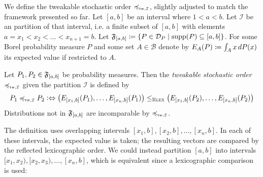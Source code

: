 \documentclass[a4paper]{scrreprt}
\newcommand{\B}{\mathcal{B}}
\begin{document}
    We define the tweakable stochastic order $\leqtw$, slightly adjusted to match the framework presented so far.
    Let $[a, b]$ be an interval where $1 < a < b$. Let $\mathcal{I}$ be an partition of that interval, i.e. a finite subset of $[a, b]$ with elements $a = x_1 < x_2 < \dots < x_{n+1} = b$.
    Let $\mathfrak{F}_{[a, b]} \coloneqq \{P \in \mathcal{D}_P \mid \operatorname{supp}(P) \subseteq [a, b]\}$.
    For some Borel probability measure $P$ and some set $A \in \B$ denote by $E_A(P) \coloneqq \int_{A} x \, dP(x)$ its expected value if restricted to $A$. 
    \begin{defn}
        \label{def:tweakableStochasticOrder}
        Let $P_1, P_2 \in \mathfrak{F}_{[a, b]}$ be probability measures.
        Then the \emph{tweakable stochastic order} $\leqtw$ given the partition $\mathcal{I}$ is defined by
        \begin{gather*}
            P_1 \leqtw P_2 \colonlra \bigpars{E_{[x_1, b]}(P_{1}), \dots, E_{[x_n, b]}(P_1)} \leqRlex \bigpars{E_{[x_1, b]}(P_2), \dots, E_{[x_n, b]}(P_2)}
        \end{gather*}
        Distributions not in $\mathfrak{F}_{[a, b]}$ are incomparable by $\leqtw$.
    \end{defn}

    The definition uses overlapping intervals $[x_1, b], [x_2, b], \dots, [x_n, b]$. In each of these intervals, the expected value is taken; the resulting vectors are compared by the reflected lexicographic order. We could instead partition $[a, b]$  into intervals $[x_1, x_2), [x_2, x_3), \dots, [x_n, b]$, which is equivalent since a lexicographic comparison is used:
\end{document}
